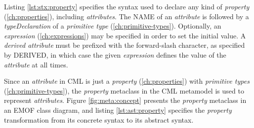 Listing \ref{lst:stx:property} specifies the syntax used
to declare any kind of \emph{property} (\ref{ch:properties}),
including \emph{attributes}.
The NAME of an \emph{attribute} is followed
by a \emph{typeDeclaration} of a \emph{primitive type}
(\ref{ch:primitive-types}).
Optionally, an \emph{expression} (\ref{ch:expressions}) may be specified
in order to set the initial value.
A \emph{derived attribute} must be prefixed with the forward-slash character,
as specified by DERIVED,
in which case the given \emph{expression} defines the value
of the \emph{attribute} at all times.

Since an \emph{attribute} in CML is just a \emph{property} (\ref{ch:properties})
with \emph{primitive types} (\ref{ch:primitive-types}),
the \emph{property} metaclass in the CML metamodel is used to represent
\emph{attributes}.
Figure \ref{fig:meta:concept} presents the \emph{property} metaclass
in an EMOF \cite{mof} class diagram,
and listing \ref{lst:ast:property} specifies
the \emph{property} transformation
from its concrete syntax to its abstract syntax.
